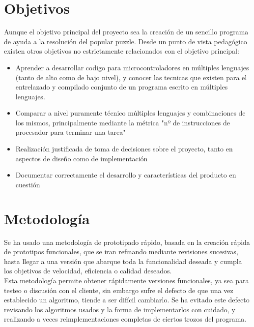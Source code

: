 \documentclass[12pt,letterpaper]{article}
\begin{document}
\section{Objetivos}
Aunque el objetivo principal del proyecto sea la creaci\'on de un sencillo
programa de ayuda a la resoluci\'on del popular puzzle. Desde un punto de
vista pedag\'ogico existen otros objetivos no estrictamente relacionados
con el objetivo principal:
\begin{itemize}
\item Aprender a desarrollar codigo para microcontroladores en
  m\'ultiples lenguajes (tanto de alto como de bajo nivel), y
  conocer las tecnicas que existen para el entrelazado y compilado
  conjunto de un programa escrito en m\'ultiples lenguajes.
\item Comparar a nivel puramente t\'ecnico m\'ultiples lenguajes y
  combinaciones de los mismos, principalmente mediante la m\'etrica
  "nº de instrucciones de procesador para terminar una tarea"
\item Realizaci\'on justificada de toma de decisiones sobre el proyecto,
  tanto en aspectos de diseño como de implementaci\'on
\item Documentar correctamente el desarrollo y caracter\'isticas del
  producto en cuesti\'on
\end{itemize}

\clearpage
\section{Metodolog\'ia}
Se ha usado una metodolog\'ia de prototipado r\'apido, basada en la
creaci\'on r\'apida de prototipos funcionales, que se iran refinando
mediante revisiones sucesivas, hasta llegar a una versi\'on que
abarque toda la funcionalidad deseada y cumpla los objetivos de
velocidad, eficiencia o calidad deseados. \\
Esta metodolog\'ia permite obtener r\'apidamente versiones
funcionales, ya sea para testeo o discusi\'on con el cliente, sin
embargo sufre el defecto de que una vez establecido un algoritmo,
tiende a ser dif\'icil cambiarlo. Se ha evitado este defecto revisando
los algoritmos usados y la forma de implementarlos con cuidado, y
realizando a veces reimplementaciones completas de ciertos trozos del
programa.
\end{document}
